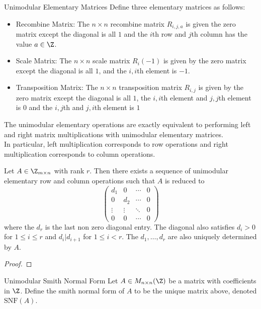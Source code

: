 \documentclass[a4paper]{article}
\begin{document}
\begin{defn}{Unimodular Elementary Matrices}{} Define three elementary matrices as follows: 
\begin{itemize}
\item Recombine Matrix: The $n\times n$ recombine matrix $R_{i,j,a}$ is given the zero matrix except the diagonal is all $1$ and the $i$th row and $j$th column has the value $a\in\Z$. 
\item Scale Matrix: The $n\times n$ scale matrix $R_{i}(-1)$ is given by  the zero matrix except the diagonal is all $1$, and the $i,i$th element is $-1$. 
\item Transposition Matrix: The $n\times n$ transposition matrix $R_{i,j}$ is given by the zero matrix except the diagonal is all $1$, the $i,i$th element and $j,j$th element is $0$ and the $i,j$th and $j,i$th element is $1$
\end{itemize}
\end{defn}

\begin{prp}{}{} The unimodular elementary operations are exactly equivalent to performing left and right matrix multiplications with unimodular elementary matrices. \\
In particular, left multiplication corresponds to row operations and right multiplication corresponds to column operations. 
\end{prp}

\begin{thm}{}{} Let $A\in\Z_{m\times n}$ with rank $r$. Then there exists a sequence of unimodular elementary row and column operations such that $A$ is reduced to $$\begin{pmatrix}
d_1 & 0 & \cdots & 0\\
0 & d_2 & \cdots & 0\\
\vdots & \vdots & \ddots & 0\\
0 & 0 & \cdots & 0
\end{pmatrix}$$ where the $d_r$ is the last non zero diagonal entry. The diagonal also satisfies $d_i>0$ for $1\leq i\leq r$ and $d_i|d_{i+1}$ for $1\leq i<r$. The $d_1,\dots,d_r$ are also uniquely determined by $A$. 
\begin{proof}
\end{proof}
\end{thm}

\begin{defn}{Unimodular Smith Normal Form}{} Let $A\in M_{n\times n}(\Z)$ be a matrix with coefficients in $\Z$. Define the smith normal form of $A$ to be the unique matrix above, denoted $\text{SNF}(A)$. 
\end{defn}
\end{document}
